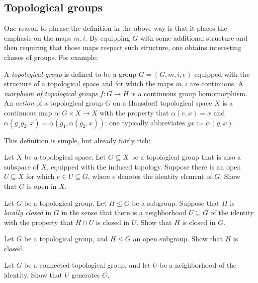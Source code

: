 \documentclass[reqno]{amsart} 
\begin{document}
\subsection{Topological groups}
\label{sec:orgaff9727}
One reason to phrase the definition in the above way is that
it places the emphasis on the maps $m,i$.  By equipping $G$ with
some additional structure and then requiring that those maps
respect such structure, one obtains interesting classes of
groups.  For example:
\begin{definition}\label{defn:top-gp}
 A \emph{topological group} is defined to
be a group $G = (G,m,i,e)$ equipped with the structure of a
topological space and for which the maps $m, i$ are continuous. 
A \emph{morphism of topological groups} $f : G \rightarrow H$
is a continuous group homomorphism.
An \emph{action} of a topological group $G$ on a Hausdorff topological space
$X$ is a continuous map $\alpha : G \times X \rightarrow X$
with the property that
$\alpha(e,x) = x$
and
$\alpha(g_1 g_2,x) = \alpha(g_1,\alpha(g_2,x))$;
one typically abbreviates $g x := \alpha(g,x)$.
\end{definition}
This definition is simple, but already fairly rich:
\begin{exercise}\label{exercise:openness-top-groups-ambient-spaces}
  Let $X$ be a topological space.
  Let $G \subseteq X$ be a topological group
  that is also a subspace of $X$, equipped with the induced
  topology.
  Suppose there is an open $U
  \subseteq X$
  for which $e \in U \subseteq G$,
  where $e$ denotes the identity element of $G$.
  Show that $G$ is open in $X$.
\end{exercise}
\begin{exercise}
  Let $G$ be a topological group.  Let $H \leq G$ be a subgroup.
  Suppose that $H$ is \emph{locally closed} in $G$ in the sense
  that there is a neighborhood $U \subseteq G$ of the identity
  with the property that $H \cap U$ is closed in $U$.  Show that
  $H$ is closed in $G$.
\end{exercise}
\begin{exercise}
  Let $G$ be a topological group,
  and $H \leq G$ an open subgroup.
  Show that $H$ is closed.
\end{exercise}
\begin{exercise}\label{exercise:connected-topological-group-generated-by-any-neighborhood}
  Let $G$ be a connected topological group,
  and let $U$ be a neighborhood of the identity.
  Show that $U$ generates $G$.
\end{exercise}
\end{document}
